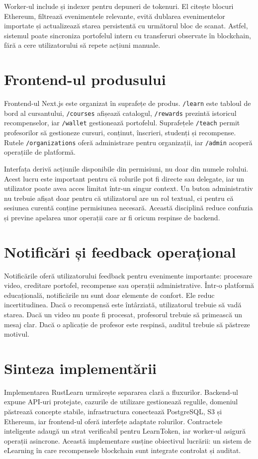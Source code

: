 Worker-ul include și indexer pentru depuneri de tokenuri. El citește blocuri Ethereum, filtrează evenimentele relevante, evită dublarea evenimentelor importate și actualizează starea persistentă cu următorul bloc de scanat. Astfel, sistemul poate sincroniza portofelul intern cu transferuri observate în blockchain, fără a cere utilizatorului să repete acțiuni manuale.

\section{Frontend-ul produsului}
Frontend-ul Next.js este organizat în suprafețe de produs. \texttt{/learn} este tabloul de bord al cursantului, \texttt{/courses} afișează catalogul, \texttt{/rewards} prezintă istoricul recompenselor, iar \texttt{/wallet} gestionează portofelul. Suprafețele \texttt{/teach} permit profesorilor să gestioneze cursuri, conținut, înscrieri, studenți și recompense. Rutele \texttt{/organizations} oferă administrare pentru organizații, iar \texttt{/admin} acoperă operațiile de platformă.

Interfața derivă acțiunile disponibile din permisiuni, nu doar din numele rolului. Acest lucru este important pentru că rolurile pot fi directe sau delegate, iar un utilizator poate avea acces limitat într-un singur context. Un buton administrativ nu trebuie afișat doar pentru că utilizatorul are un rol textual, ci pentru că sesiunea curentă conține permisiunea necesară. Această disciplină reduce confuzia și previne apelarea unor operații care ar fi oricum respinse de backend.

\section{Notificări și feedback operațional}
Notificările oferă utilizatorului feedback pentru evenimente importante: procesare video, creditare portofel, recompense sau operații administrative. Într-o platformă educațională, notificările nu sunt doar elemente de confort. Ele reduc incertitudinea. Dacă o recompensă este întârziată, utilizatorul trebuie să vadă starea. Dacă un video nu poate fi procesat, profesorul trebuie să primească un mesaj clar. Dacă o aplicație de profesor este respinsă, auditul trebuie să păstreze motivul.



\section{Sinteza implementării}
Implementarea RustLearn urmărește separarea clară a fluxurilor. Backend-ul expune API-uri protejate, cazurile de utilizare gestionează regulile, domeniul păstrează concepte stabile, infrastructura conectează PostgreSQL, S3 și Ethereum, iar frontend-ul oferă interfețe adaptate rolurilor. Contractele inteligente adaugă un strat verificabil pentru LearnToken, iar worker-ul asigură operații asincrone. Această implementare susține obiectivul lucrării: un sistem de eLearning în care recompensele blockchain sunt integrate controlat și auditat.

